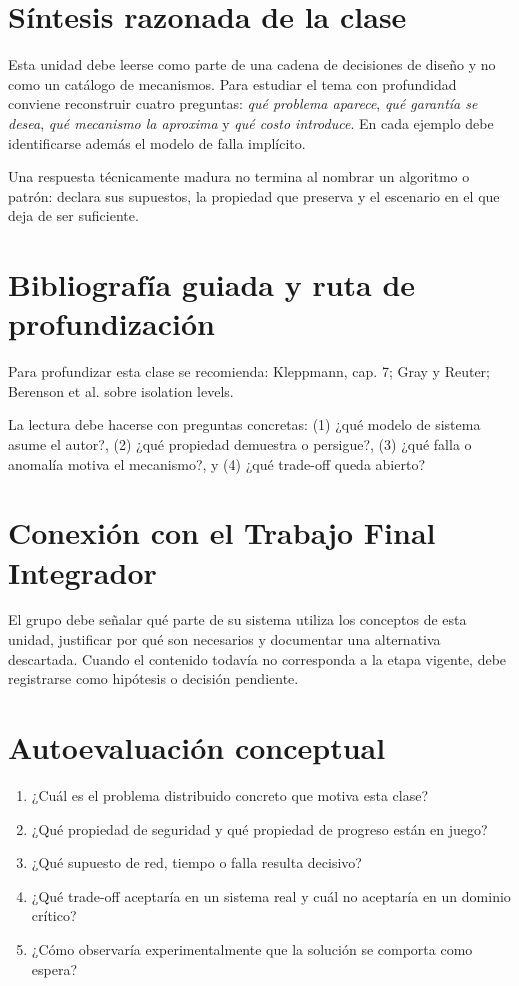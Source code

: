 \documentclass[variant=apuntes,cover=institutional,mode=screen]{ua-engineering-v6-article}
\begin{document}
\section{Síntesis razonada de la clase}
Esta unidad debe leerse como parte de una cadena de decisiones de diseño y no como un catálogo de mecanismos. Para estudiar el tema con profundidad conviene reconstruir cuatro preguntas: \emph{qué problema aparece}, \emph{qué garantía se desea}, \emph{qué mecanismo la aproxima} y \emph{qué costo introduce}. En cada ejemplo debe identificarse además el modelo de falla implícito.

\begin{uakeybox}
Una respuesta técnicamente madura no termina al nombrar un algoritmo o patrón: declara sus supuestos, la propiedad que preserva y el escenario en el que deja de ser suficiente.
\end{uakeybox}

\section{Bibliografía guiada y ruta de profundización}
Para profundizar esta clase se recomienda: Kleppmann, cap. 7; Gray y Reuter; Berenson et al. sobre isolation levels.

La lectura debe hacerse con preguntas concretas: (1) ¿qué modelo de sistema asume el autor?, (2) ¿qué propiedad demuestra o persigue?, (3) ¿qué falla o anomalía motiva el mecanismo?, y (4) ¿qué trade-off queda abierto?

\section{Conexión con el Trabajo Final Integrador}
El grupo debe señalar qué parte de su sistema utiliza los conceptos de esta unidad, justificar por qué son necesarios y documentar una alternativa descartada. Cuando el contenido todavía no corresponda a la etapa vigente, debe registrarse como hipótesis o decisión pendiente.

\section{Autoevaluación conceptual}
\begin{enumerate}
\item ¿Cuál es el problema distribuido concreto que motiva esta clase?
\item ¿Qué propiedad de seguridad y qué propiedad de progreso están en juego?
\item ¿Qué supuesto de red, tiempo o falla resulta decisivo?
\item ¿Qué trade-off aceptaría en un sistema real y cuál no aceptaría en un dominio crítico?
\item ¿Cómo observaría experimentalmente que la solución se comporta como espera?
\end{enumerate}
\end{document}
